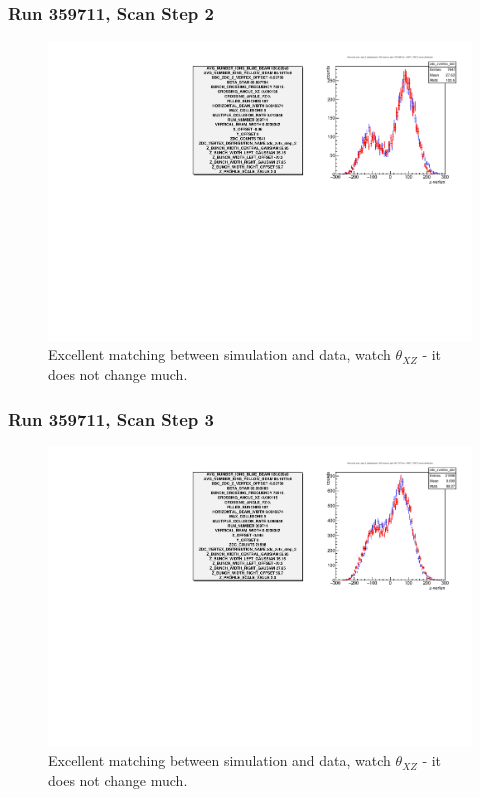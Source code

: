 \begin{frame}
\frametitle{Run 359711, Scan Step 2}
\begin{figure}
\begin{center}
\includegraphics[width=\linewidth]{"figs/359711_step_2_zdc_zvertex"}
\caption{Excellent matching between simulation and data, watch $\theta_{XZ}$ - it does not change much.}
\label{fig:359711_step_2_zdc_zvertex}
\end{center}\end{figure}
\end{frame}

\begin{frame}
\frametitle{Run 359711, Scan Step 3}
\begin{figure}
\begin{center}
\includegraphics[width=\linewidth]{"figs/359711_step_3_zdc_zvertex"}
\caption{Excellent matching between simulation and data, watch $\theta_{XZ}$ - it does not change much.}
\label{fig:359711_step_3_zdc_zvertex}
\end{center}\end{figure}
\end{frame}

